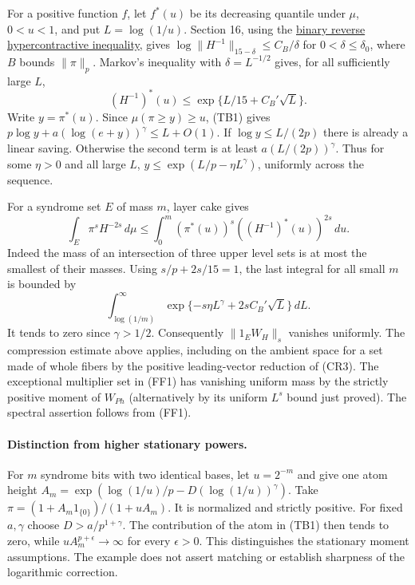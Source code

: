 For a positive function $f$, let $f^*(u)$ be its decreasing quantile
under $\mu$, $0<u<1$, and put $L=\log(1/u)$. Section 16, using the
\href{https://www.cs.cmu.edu/~odonnell/papers/nicd.pdf}{binary reverse
hypercontractive inequality}, gives
$\log\|H^{-1}\|_{15-\delta}\le C_B/\delta$ for $0<\delta\le\delta_0$,
where $B$ bounds $\|\pi\|_p$. Markov's inequality with
$\delta=L^{-1/2}$ gives, for all sufficiently large $L$,
\[
 (H^{-1})^*(u)\le \exp\{L/15+C_B'\sqrt L\}.
\]
Write $y=\pi^*(u)$. Since $\mu(\pi\ge y)\ge u$, (TB1) gives
$p\log y+a(\log(e+y))^\gamma\le L+O(1)$. If $\log y\le L/(2p)$
there is already a linear saving. Otherwise the second term is at
least $a(L/(2p))^\gamma$. Thus for some $\eta>0$ and all large $L$,
$y\le\exp(L/p-\eta L^\gamma)$, uniformly across the sequence.

For a syndrome set $E$ of mass $m$, layer cake gives
\[
  \int_E \pi^s H^{-2s}\,d\mu
  \le \int_0^m (\pi^*(u))^s ((H^{-1})^*(u))^{2s}\,du .
\]
Indeed the mass of an intersection of three upper level sets is at most
the smallest of their masses. Using $s/p+2s/15=1$, the last integral
for all small $m$ is bounded by
\[
 \int_{\log(1/m)}^\infty
     \exp\{-s\eta L^\gamma+2sC_B'\sqrt L\}\,dL .
\]
It tends to zero since $\gamma>1/2$. Consequently $\|1_E W_H\|_s$
vanishes uniformly. The compression estimate above applies, including
on the ambient space for a set made of whole fibers by the positive
leading-vector reduction of (CR3). The exceptional multiplier set in
(FF1) has vanishing uniform mass by the strictly positive moment of
$W_{Ph}$ (alternatively by its uniform $L^s$ bound just proved).
The spectral assertion follows from (FF1).

\paragraph{Distinction from higher stationary powers.}
For $m$ syndrome bits with two identical bases, let $u=2^{-m}$ and
give one atom height $A_m=\exp(\log(1/u)/p-D(\log(1/u))^\gamma)$.
Take $\pi=(1+A_m 1_{\{0\}})/(1+u A_m)$.
It is normalized and strictly positive. For fixed $a,\gamma$ choose
$D>a/p^{1+\gamma}$. The contribution of the atom in (TB1) then
tends to zero, while $uA_m^{p+\epsilon}\to\infty$ for every
$\epsilon>0$. This distinguishes the stationary moment assumptions.
The example does not assert matching or establish sharpness of the
logarithmic correction.
